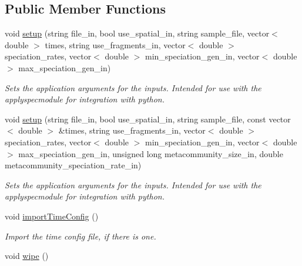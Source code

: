 \subsection*{Public Member Functions}
\begin{DoxyCompactItemize}
\item 
void \hyperlink{struct_spec_sim_parameters_acbd3e700200cf2bb07b3e58f1dc95ec6}{setup} (string file\+\_\+in, bool use\+\_\+spatial\+\_\+in, string sample\+\_\+file, vector$<$ double $>$ times, string use\+\_\+fragments\+\_\+in, vector$<$ double $>$ speciation\+\_\+rates, vector$<$ double $>$ min\+\_\+speciation\+\_\+gen\+\_\+in, vector$<$ double $>$ max\+\_\+speciation\+\_\+gen\+\_\+in)
\begin{DoxyCompactList}\small\item\em Sets the application arguments for the inputs. Intended for use with the applyspecmodule for integration with python. \end{DoxyCompactList}\item 
void \hyperlink{struct_spec_sim_parameters_acabbdf627ecb8bec48314f7990b9b575}{setup} (string file\+\_\+in, bool use\+\_\+spatial\+\_\+in, string sample\+\_\+file, const vector$<$ double $>$ \&times, string use\+\_\+fragments\+\_\+in, vector$<$ double $>$ speciation\+\_\+rates, vector$<$ double $>$ min\+\_\+speciation\+\_\+gen\+\_\+in, vector$<$ double $>$ max\+\_\+speciation\+\_\+gen\+\_\+in, unsigned long metacommunity\+\_\+size\+\_\+in, double metacommunity\+\_\+speciation\+\_\+rate\+\_\+in)
\begin{DoxyCompactList}\small\item\em Sets the application arguments for the inputs. Intended for use with the applyspecmodule for integration with python. \end{DoxyCompactList}\item 
void \hyperlink{struct_spec_sim_parameters_ae0196a50a551a821b75b6e92a35534a7}{import\+Time\+Config} ()\hypertarget{struct_spec_sim_parameters_ae0196a50a551a821b75b6e92a35534a7}{}\label{struct_spec_sim_parameters_ae0196a50a551a821b75b6e92a35534a7}

\begin{DoxyCompactList}\small\item\em Import the time config file, if there is one. \end{DoxyCompactList}\item 
void \hyperlink{struct_spec_sim_parameters_a10aac8e7ab592f53b071287e60483b88}{wipe} ()\hypertarget{struct_spec_sim_parameters_a10aac8e7ab592f53b071287e60483b88}{}\label{struct_spec_sim_parameters_a10aac8e7ab592f53b071287e60483b88}


\end{DoxyCompactItemize}
